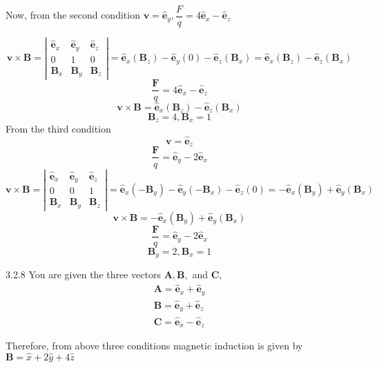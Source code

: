 \documentclass{styles/kaobook}
\begin{document}
Now, from the second condition $\mathbf{v}=\hat{\mathbf{e}}_{y}, \dfrac{F}{q}=4 \hat{\mathbf{e}}_{x}-\hat{\mathbf{e}}_{z}$

$$
\mathbf{v} \times \mathbf{B}=\left|\begin{array}{ccc}
\hat{\mathbf{e}}_{x} & \hat{\mathbf{e}}_{y} & \hat{\mathbf{e}}_{z} \\
0 & 1 & 0 \\
\mathbf{B}_{x} & \mathbf{B}_{y} & \mathbf{B}_{z}
\end{array}\right|=\hat{\mathbf{e}}_{x}\left(\mathbf{B}_{z}\right)-\hat{\mathbf{e}}_{y}(0)-\hat{\mathbf{e}}_{z}\left(\mathbf{B}_{x}\right)=\hat{\mathbf{e}}_{x}\left(\mathbf{B}_{z}\right)-\hat{\mathbf{e}}_{z}\left(\mathbf{B}_{x}\right)
$$
$$\frac{\mathbf{F}}{q}=4 \hat{\mathbf{e}}_{x}-\hat{\mathbf{e}}_{z}$$
$$ \mathbf{v} \times \mathbf{B}=\hat{\mathbf{e}}_{x}\left(\mathbf{B}_{z}\right)-\hat{\mathbf{e}}_{z}\left(\mathbf{B}_{x}\right)$$
$$\mathbf{B}_{z}=4, \mathbf{B}_{x}=1$$
From the third condition 
$$
\mathbf{v}=\hat{\mathbf{e}}_{z}$$
$$ \frac{\mathbf{F}}{q}=\hat{\mathbf{e}}_{y}-2 \hat{\mathbf{e}}_{x}
$$
$$
\mathbf{v} \times \mathbf{B}=\left|\begin{array}{ccc}
\hat{\mathbf{e}}_{x} & \hat{\mathbf{e}}_{y} & \hat{\mathbf{e}}_{z} \\
0 & 0 & 1 \\
\mathbf{B}_{x} & \mathbf{B}_{y} & \mathbf{B}_{z}
\end{array}\right|=\hat{\mathbf{e}}_{x}\left(-\mathbf{B}_{y}\right)-\hat{\mathbf{e}}_{y}\left(-\mathbf{B}_{x}\right)-\hat{\mathbf{e}}_{z}(0)=-\hat{\mathbf{e}}_{x}\left(\mathbf{B}_{y}\right)+\hat{\mathbf{e}}_{y}\left(\mathbf{B}_{x}\right)
$$
$$\mathbf{v} \times \mathbf{B}=-\hat{\mathbf{e}}_{x}\left(\mathbf{B}_{y}\right)+\hat{\mathbf{e}}_{y}\left(\mathbf{B}_{x}\right)$$
$$ \frac{\mathbf{F}}{q}=\hat{\mathbf{e}}_{y}-2 \hat{\mathbf{e}}_{x}$$
$$\mathbf{B}_{y}=2, \mathbf{B}_{x}=1$$


\begin{greenbox}{3.2.8}
You are given the three vectors $\mathbf{A}, \mathbf{B},$ and $\mathbf{C},$
$$
\begin{array}{l}{\mathbf{A}=\hat{\mathbf{e}}_{x}+\hat{\mathbf{e}}_{y}} \\ {\mathbf{B}=\hat{\mathbf{e}}_{y}+\hat{\mathbf{e}}_{z}} \\ {\mathbf{C}=\hat{\mathbf{e}}_{x}-\hat{\mathbf{e}}_{z}}\end{array}
$$

Therefore, from above three conditions magnetic induction is given by $ \mathbf{B} = \hat { x } + 2 \hat { y } + 4 \hat { z }$
\end{greenbox}
\end{document}
